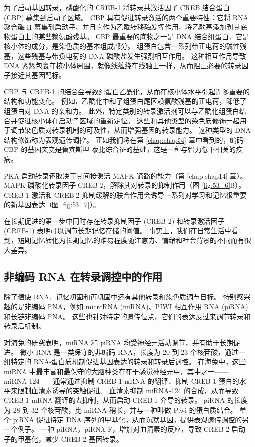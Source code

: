 为了启动基因转录，磷酸化的 CREB-1 将转录共激活因子 CREB 结合蛋白 (CBP) 募集到启动子区域。
CBP 具有促进转录激活的两个重要特性：它将 RNA 聚合酶 II 募集到启动子，并且它作为乙酰转移酶发挥作用，将乙酰基添加到其底物蛋白上的某些赖氨酸残基。
CBP 最重要的底物之一是 DNA 结合组蛋白，它是核小体的成分，是染色质的基本组成部分。
组蛋白包含一系列带正电荷的碱性残基，这些残基与带负电荷的 DNA 磷酸盐发生强烈相互作用。
这种相互作用导致 DNA 紧紧包裹在核小体周围，就像线缠绕在线轴上一样，从而阻止必要的转录因子接近其基因靶标。


CBP 与 CREB-1 的结合会导致组蛋白乙酰化，从而在核小体水平引起许多重要的结构和功能变化。
例如，乙酰化中和了组蛋白尾区赖氨酸残基的正电荷，降低了组蛋白对 DNA 的亲和力。
此外，特定类别的转录激活剂可以与乙酰化组蛋白结合并促进核小体在启动子区域的重新定位。 这些和其他类型的染色质修饰一起用于调节染色质对转录机制的可及性，从而增强基因的转录能力。
这种类型的 DNA 结构修饰称为表观遗传调控。
正如我们将在第 \ref{chap:chap54} 章中看到的，编码 CBP 的基因突变是鲁宾斯坦-泰比综合征的基础，这是一种与智力低下相关的疾病。


PKA 启动转录还取决于其间接激活 MAPK 通路的能力（第 \ref{chap:chap14} 章）。
MAPK 磷酸化转录因子 CREB-2，解除其对转录的抑制作用（图 \ref{fig:53_6}B）。
CREB-1 激活和 CREB-2 抑制缓解的联合作用会诱导一系列对学习和记忆很重要的新基因表达（图 \ref{fig:53_7}）。


在长期促进的第一步中同时存在转录抑制因子 (CREB-2) 和转录激活因子 (CREB-1) 表明可以调节长期记忆存储的阈值。
事实上，我们在日常生活中看到，短期记忆转化为长期记忆的难易程度随注意力、情绪和社会背景的不同而有很大差异。



\subsection{非编码 RNA 在转录调控中的作用}

除了信使 RNA，记忆巩固和再巩固中还有其他转录和染色质调节目标。
特别感兴趣的是非编码 RNA，例如 microRNA (miRNA)、PIWI 相互作用 RNA (piRNA) 和长链非编码 RNA。
这些也针对特定的遗传位点，它们的表达反过来调节转录和转录后机制。


对海兔的研究表明，miRNA 和 piRNA 均受神经元活动调节，并有助于长期促进。
微小 RNA 是一类保守的非编码 RNA，长度为 20 到 23 个核苷酸，通过一组特定的 RNA-蛋白质机制促进基因表达的转录和转录后调控。
在海兔中，这些 miRNA 中最丰富和最保守的大脑种类存在于感觉神经元中，其中之一——miRNA-124——通常通过抑制 CREB-1 mRNA 的翻译、抑制 CREB-1 蛋白的水平来限制血清素诱导的突触促进。
血清素抑制 miRNA-124 的合成，从而导致 CREB-1 mRNA 翻译的去抑制，从而启动 CREB-1 介导的转录。
piRNA 的长度为 28 到 32 个核苷酸，比 miRNA 稍长，并与一种叫做 Piwi 的蛋白质结合。
单个 piRNA 促进特定 DNA 序列的甲基化，从而沉默基因，提供表观遗传调控的另一个例子。
一种 piRNA，piRNA-F，增加对血清素的反应，导致 CREB-2 启动子的甲基化，减少 CREB-2 基因转录。


